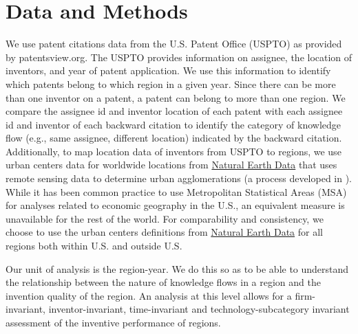 \documentclass[12pt,letterpaper]{article}
\begin{document}
\section*{Data and Methods}
We use patent citations data from the U.S. Patent Office (USPTO) as provided by patentsview.org. The USPTO provides information on assignee, the location of inventors, and year of patent application. We use this information to identify which patents belong to which region in a given year. Since there can be more than one inventor on a patent, a patent can belong to more than one region. We compare the assignee id and inventor location of each patent with each assignee id and inventor of each backward citation  to identify the category of knowledge flow (e.g., same assignee, different location) indicated by the backward citation. Additionally, to map location data of inventors from USPTO to regions, we use urban centers data for worldwide locations from \href{http://www.naturalearthdata.com/downloads/10m-cultural-vectors/}{Natural Earth Data} that uses remote sensing data to determine urban agglomerations (a process developed in \citet*{Schneider2003}).  While it has been common practice to use Metropolitan Statistical Areas (MSA) for analyses related to economic geography in the U.S., an equivalent measure is unavailable for the rest of the world. For comparability and consistency, we choose to use the urban centers definitions from \href{http://www.naturalearthdata.com/downloads/10m-cultural-vectors/}{Natural Earth Data} for all regions both within U.S. and outside U.S. \par

Our unit of analysis is the region-year. We do this so as to be able to understand the relationship between the nature of knowledge flows in a region and the invention quality of the region. An analysis at this level allows for a firm-invariant, inventor-invariant, time-invariant and technology-subcategory invariant assessment of the  inventive performance of regions.\par
\end{document}
